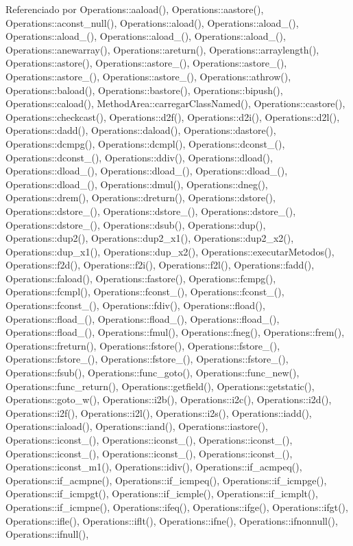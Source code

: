 Referenciado por Operations\+::aaload(), Operations\+::aastore(), Operations\+::aconst\+\_\+null(), Operations\+::aload(), Operations\+::aload\+\_(), Operations\+::aload\+\_(), Operations\+::aload\+\_(), Operations\+::aload\+\_(), Operations\+::anewarray(), Operations\+::areturn(), Operations\+::arraylength(), Operations\+::astore(), Operations\+::astore\+\_(), Operations\+::astore\+\_(), Operations\+::astore\+\_(), Operations\+::astore\+\_(), Operations\+::athrow(), Operations\+::baload(), Operations\+::bastore(), Operations\+::bipush(), Operations\+::caload(), Method\+Area\+::carregar\+Class\+Named(), Operations\+::castore(), Operations\+::checkcast(), Operations\+::d2f(), Operations\+::d2i(), Operations\+::d2l(), Operations\+::dadd(), Operations\+::daload(), Operations\+::dastore(), Operations\+::dcmpg(), Operations\+::dcmpl(), Operations\+::dconst\+\_(), Operations\+::dconst\+\_(), Operations\+::ddiv(), Operations\+::dload(), Operations\+::dload\+\_(), Operations\+::dload\+\_(), Operations\+::dload\+\_(), Operations\+::dload\+\_(), Operations\+::dmul(), Operations\+::dneg(), Operations\+::drem(), Operations\+::dreturn(), Operations\+::dstore(), Operations\+::dstore\+\_(), Operations\+::dstore\+\_(), Operations\+::dstore\+\_(), Operations\+::dstore\+\_(), Operations\+::dsub(), Operations\+::dup(), Operations\+::dup2(), Operations\+::dup2\+\_\+x1(), Operations\+::dup2\+\_\+x2(), Operations\+::dup\+\_\+x1(), Operations\+::dup\+\_\+x2(), Operations\+::executar\+Metodos(), Operations\+::f2d(), Operations\+::f2i(), Operations\+::f2l(), Operations\+::fadd(), Operations\+::faload(), Operations\+::fastore(), Operations\+::fcmpg(), Operations\+::fcmpl(), Operations\+::fconst\+\_(), Operations\+::fconst\+\_(), Operations\+::fconst\+\_(), Operations\+::fdiv(), Operations\+::fload(), Operations\+::fload\+\_(), Operations\+::fload\+\_(), Operations\+::fload\+\_(), Operations\+::fload\+\_(), Operations\+::fmul(), Operations\+::fneg(), Operations\+::frem(), Operations\+::freturn(), Operations\+::fstore(), Operations\+::fstore\+\_(), Operations\+::fstore\+\_(), Operations\+::fstore\+\_(), Operations\+::fstore\+\_(), Operations\+::fsub(), Operations\+::func\+\_\+goto(), Operations\+::func\+\_\+new(), Operations\+::func\+\_\+return(), Operations\+::getfield(), Operations\+::getstatic(), Operations\+::goto\+\_\+w(), Operations\+::i2b(), Operations\+::i2c(), Operations\+::i2d(), Operations\+::i2f(), Operations\+::i2l(), Operations\+::i2s(), Operations\+::iadd(), Operations\+::iaload(), Operations\+::iand(), Operations\+::iastore(), Operations\+::iconst\+\_(), Operations\+::iconst\+\_(), Operations\+::iconst\+\_(), Operations\+::iconst\+\_(), Operations\+::iconst\+\_(), Operations\+::iconst\+\_(), Operations\+::iconst\+\_\+m1(), Operations\+::idiv(), Operations\+::if\+\_\+acmpeq(), Operations\+::if\+\_\+acmpne(), Operations\+::if\+\_\+icmpeq(), Operations\+::if\+\_\+icmpge(), Operations\+::if\+\_\+icmpgt(), Operations\+::if\+\_\+icmple(), Operations\+::if\+\_\+icmplt(), Operations\+::if\+\_\+icmpne(), Operations\+::ifeq(), Operations\+::ifge(), Operations\+::ifgt(), Operations\+::ifle(), Operations\+::iflt(), Operations\+::ifne(), Operations\+::ifnonnull(), Operations\+::ifnull(), 
